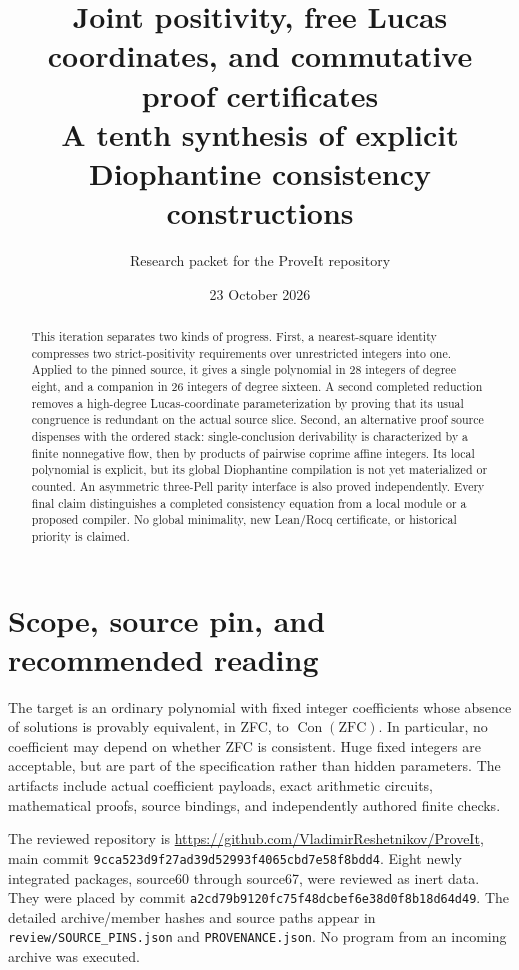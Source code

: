 \documentclass[11pt]{article}
\title{Joint positivity, free Lucas coordinates, and commutative proof certificates\\\large A tenth synthesis of explicit Diophantine consistency constructions}
\author{Research packet for the ProveIt repository}
\date{23 October 2026}
\newcommand{\Con}{\operatorname{Con}}
\begin{document}
\maketitle
\begin{abstract}
This iteration separates two kinds of progress. First, a nearest-square
identity compresses two strict-positivity requirements over unrestricted
integers into one. Applied to the pinned source, it gives a single
polynomial in 28 integers of degree eight, and a companion in 26 integers
of degree sixteen. A second completed reduction removes a high-degree
Lucas-coordinate parameterization by proving that its usual congruence
is redundant on the actual source slice. Second, an alternative proof
source dispenses with the ordered stack: single-conclusion derivability
is characterized by a finite nonnegative flow, then by products of
pairwise coprime affine integers. Its local polynomial is explicit,
but its global Diophantine compilation is not yet materialized or counted.
An asymmetric three-Pell parity interface is also proved independently.
Every final claim distinguishes a completed consistency equation from
a local module or a proposed compiler. No global minimality, new
Lean/Rocq certificate, or historical priority is claimed.
\end{abstract}
\setcounter{tocdepth}{1}
\tableofcontents
\clearpage
\section{Scope, source pin, and recommended reading}
The target is an ordinary polynomial with fixed integer coefficients
whose absence of solutions is provably equivalent, in ZFC, to
$\Con(\mathrm{ZFC})$. In particular, no coefficient may depend on whether
ZFC is consistent. Huge fixed integers are acceptable, but are part of
the specification rather than hidden parameters. The artifacts include
actual coefficient payloads, exact arithmetic circuits, mathematical
proofs, source bindings, and independently authored finite checks.

The reviewed repository is
\url{https://github.com/VladimirReshetnikov/ProveIt}, main commit
\texttt{9cca523d9f27ad39d52993f4065cbd7e58f8bdd4}.
Eight newly integrated packages, source60 through source67, were reviewed
as inert data. They were placed by commit
\texttt{a2cd79b9120fc75f48dcbef6e38d0f8b18d64d49}.
The detailed archive/member hashes and source paths appear in
\texttt{review/SOURCE\_PINS.json} and \texttt{PROVENANCE.json}.
No program from an incoming archive was executed.
\end{document}
